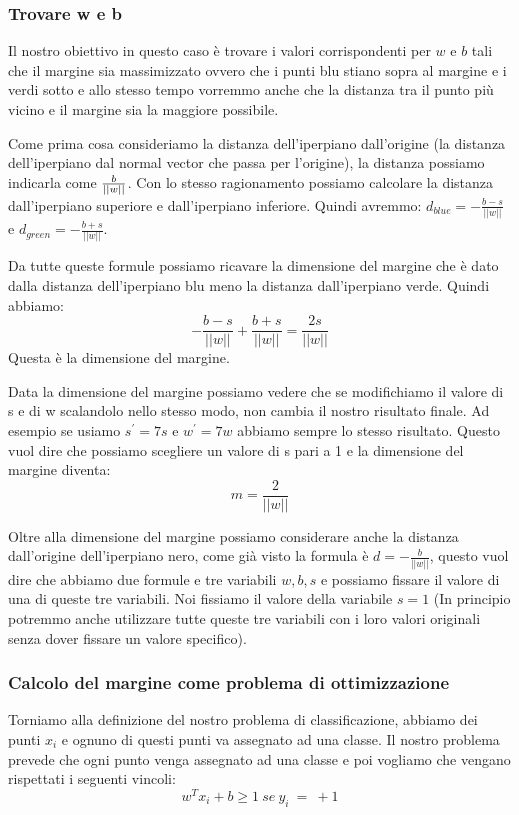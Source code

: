 \documentclass[14pt]{extreport}
\begin{document}
\subsubsection{Trovare w e b}

Il nostro obiettivo in questo caso è trovare i valori corrispondenti per $w$ e $b$ tali che il margine sia massimizzato ovvero che i punti blu stiano
sopra al margine e i verdi sotto e allo stesso tempo vorremmo anche che la distanza tra il punto più vicino e il margine sia la maggiore possibile.

Come prima cosa consideriamo la distanza dell'iperpiano dall'origine (la distanza dell'iperpiano dal normal vector che passa per l'origine), la
distanza possiamo indicarla come $\-\frac{b}{||w||}$. Con lo stesso ragionamento possiamo calcolare la distanza dall'iperpiano superiore e
dall'iperpiano inferiore. Quindi avremmo: $d_{blue} = -\frac{b-s}{||w||}$ e $d_{green} = -\frac{b+s}{||w||}$.

Da tutte queste formule possiamo ricavare la dimensione del margine che è dato dalla distanza dell'iperpiano blu meno la distanza dall'iperpiano
verde. Quindi abbiamo:
$$-\frac{b-s}{||w||} + \frac{b+s}{||w||} = \frac{2s}{||w||}$$ Questa è la dimensione del margine.

Data la dimensione del margine possiamo vedere che se modifichiamo il valore di s e di w scalandolo nello stesso modo, non cambia il nostro risultato
finale. Ad esempio se usiamo $s^{'}=7s$ e $w^{'} = 7w$ abbiamo sempre lo stesso risultato. Questo vuol dire che possiamo scegliere un valore di s pari
a 1 e la dimensione del margine diventa: $$m = \frac{2}{||w||}$$

Oltre alla dimensione del margine possiamo considerare anche la distanza dall'origine dell'iperpiano nero, come già visto la formula è $d =
	-\frac{b}{||w||}$, questo vuol dire che abbiamo due formule e tre variabili $w, b, s$ e possiamo fissare il valore di una di queste tre variabili.
	Noi fissiamo il valore della variabile $s=1$ (In principio potremmo anche utilizzare tutte queste tre variabili con i loro valori originali senza
	dover fissare un valore specifico).

\subsubsection{Calcolo del margine come problema di ottimizzazione}

Torniamo alla definizione del nostro problema di classificazione, abbiamo dei punti $x_i$ e ognuno di questi punti va assegnato ad una classe. Il
nostro problema prevede che ogni punto venga assegnato ad una classe e poi vogliamo che vengano rispettati i seguenti vincoli: $$w^Tx_i+b \geq 1 \ se\
y_i\ =\ +1$$
\end{document}
